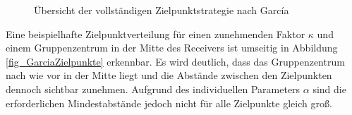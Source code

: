 \begin{figure}[p]
    \centering
    \setlength{\fboxsep}{1pt}
    \setlength{\fboxrule}{1pt}
    \caption[Übersicht der vollständigen Zielpunktstrategie nach García]{Übersicht der vollständigen Zielpunktstrategie nach García \cite[S.10]{Garcia2}}
    \label{fig_GarciaAlg}
\end{figure}

Eine beispielhafte Zielpunktverteilung für einen zunehmenden Faktor $\kappa$ und einem Gruppenzentrum in der Mitte des Receivers ist umseitig in Abbildung \ref{fig_GarciaZielpunkte} erkennbar.
Es wird deutlich, dass das Gruppenzentrum nach wie vor in der Mitte liegt und die Abstände zwischen den Zielpunkten dennoch sichtbar zunehmen.
Aufgrund des individuellen Parameters $\alpha$ sind die erforderlichen Mindestabstände jedoch nicht für alle Zielpunkte gleich groß.

